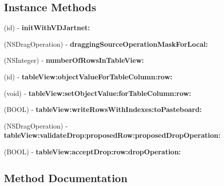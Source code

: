 \subsection*{Instance Methods}
\begin{DoxyCompactItemize}
\item 
(id) -\/ {\bfseries init\+With\+V\+D\+Jartnet\+:}
\item 
\mbox{\label{interfaceConfigTableView_ad96b218833fd0366e439418c67c83c72}} 
(N\+S\+Drag\+Operation) -\/ {\bfseries dragging\+Source\+Operation\+Mask\+For\+Local\+:}
\item 
\mbox{\label{interfaceConfigTableView_a2c830f2f6a595e4cbfa68f379ceab89a}} 
(N\+S\+Integer) -\/ {\bfseries number\+Of\+Rows\+In\+Table\+View\+:}
\item 
\mbox{\label{interfaceConfigTableView_a3c4200b20189a542326a184a4b8cea96}} 
(id) -\/ {\bfseries table\+View\+:object\+Value\+For\+Table\+Column\+:row\+:}
\item 
\mbox{\label{interfaceConfigTableView_a51b57ad7701c1c71dc1859b10c4861a1}} 
(void) -\/ {\bfseries table\+View\+:set\+Object\+Value\+:for\+Table\+Column\+:row\+:}
\item 
\mbox{\label{interfaceConfigTableView_a1f66d901e0dd655d5306c2de940d6cb4}} 
(B\+O\+OL) -\/ {\bfseries table\+View\+:write\+Rows\+With\+Indexes\+:to\+Pasteboard\+:}
\item 
\mbox{\label{interfaceConfigTableView_aa575e068650bc14812b96d14b09c9d72}} 
(N\+S\+Drag\+Operation) -\/ {\bfseries table\+View\+:validate\+Drop\+:proposed\+Row\+:proposed\+Drop\+Operation\+:}
\item 
\mbox{\label{interfaceConfigTableView_a2851d54065f8df88edd3cd382f077df9}} 
(B\+O\+OL) -\/ {\bfseries table\+View\+:accept\+Drop\+:row\+:drop\+Operation\+:}
\end{DoxyCompactItemize}


\subsection{Method Documentation}
\mbox{\label{interfaceConfigTableView_a5366e28ba30cf4b1b488457b70101444}} 
